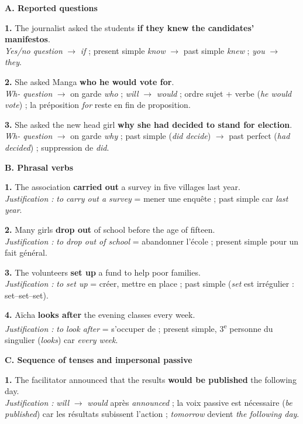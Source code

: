 \documentclass[11pt]{article}
\begin{document}
\begin{corrige}

\textbf{A. Reported questions}

\textbf{1.} The journalist asked the students \textbf{if they knew the candidates' manifestos}.\\
\emph{Yes/no question} $\rightarrow$ \emph{if} ; present simple \emph{know} $\rightarrow$ past simple \emph{knew} ; \emph{you} $\rightarrow$ \emph{they}.

\textbf{2.} She asked Manga \textbf{who he would vote for}.\\
\emph{Wh- question} $\rightarrow$ on garde \emph{who} ; \emph{will} $\rightarrow$ \emph{would} ; ordre sujet + verbe (\emph{he would vote}) ; la préposition \emph{for} reste en fin de proposition.

\textbf{3.} She asked the new head girl \textbf{why she had decided to stand for election}.\\
\emph{Wh- question} $\rightarrow$ on garde \emph{why} ; past simple (\emph{did decide}) $\rightarrow$ past perfect (\emph{had decided}) ; suppression de \emph{did}.

\textbf{B. Phrasal verbs}

\textbf{1.} The association \textbf{carried out} a survey in five villages last year.\\
\emph{Justification :} \emph{to carry out a survey} = mener une enquête ; past simple car \emph{last year}.

\textbf{2.} Many girls \textbf{drop out} of school before the age of fifteen.\\
\emph{Justification :} \emph{to drop out of school} = abandonner l'école ; present simple pour un fait général.

\textbf{3.} The volunteers \textbf{set up} a fund to help poor families.\\
\emph{Justification :} \emph{to set up} = créer, mettre en place ; past simple (\emph{set} est irrégulier : set--set--set).

\textbf{4.} Aïcha \textbf{looks after} the evening classes every week.\\
\emph{Justification :} \emph{to look after} = s'occuper de ; present simple, 3\textsuperscript{e} personne du singulier (\emph{looks}) car \emph{every week}.

\textbf{C. Sequence of tenses and impersonal passive}

\textbf{1.} The facilitator announced that the results \textbf{would be published} the following day.\\
\emph{Justification :} \emph{will} $\rightarrow$ \emph{would} après \emph{announced} ; la voix passive est nécessaire (\emph{be published}) car les résultats subissent l'action ; \emph{tomorrow} devient \emph{the following day}.


\end{corrige}
\end{document}
